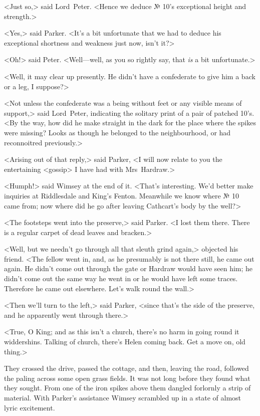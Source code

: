<Just so,> said Lord~Peter. <Hence we deduce № 10's exceptional height and strength.>

<Yes,> said Parker. <It's a bit unfortunate that we had to deduce his exceptional shortness and weakness just now, isn't it?>

<Oh!> said Peter. <Well—well, as you so rightly say, that \emph{is} a bit unfortunate.>

<Well, it may clear up presently. He didn't have a confederate to give him a back or a leg, I suppose?>

<Not unless the confederate was a being without feet or any visible means of support,> said Lord~Peter, indicating the solitary print of a pair of patched 10's. <By the way, how did he make straight in the dark for the place where the spikes were missing? Looks as though he belonged to the neighbourhood, or had reconnoitred previously.>

<Arising out of that reply,> said Parker, <I will now relate to you the entertaining <gossip> I have had with Mrs~Hardraw.>

<Humph!> said Wimsey at the end of it. <That's interesting. We'd better make inquiries at Riddlesdale and King's Fenton. Meanwhile we know where № 10 came from; now where did he go after leaving Cathcart's body by the well?>

<The footsteps went into the preserve,> said Parker. <I lost them there. There is a regular carpet of dead leaves and bracken.>

<Well, but we needn't go through all that sleuth grind again,> objected his friend. <The fellow went in, and, as he presumably is not there still, he came out again. He didn't come out through the gate or Hardraw would have seen him; he didn't come out the same way he went in or he would have left some traces. Therefore he came out elsewhere.  Let's walk round the wall.>

<Then we'll turn to the left,> said Parker, <since that's the side of the preserve, and he apparently went through there.>

<True, O King; and as this isn't a church, there's no harm in going round it widdershins. Talking of church, there's Helen coming back. Get a move on, old thing.>

They crossed the drive, passed the cottage, and then, leaving the road, followed the paling across some open grass fields. It was not long before they found what they sought. From one of the iron spikes above them dangled forlornly a strip of material. With Parker's assistance Wimsey scrambled up in a state of almost lyric excitement.

